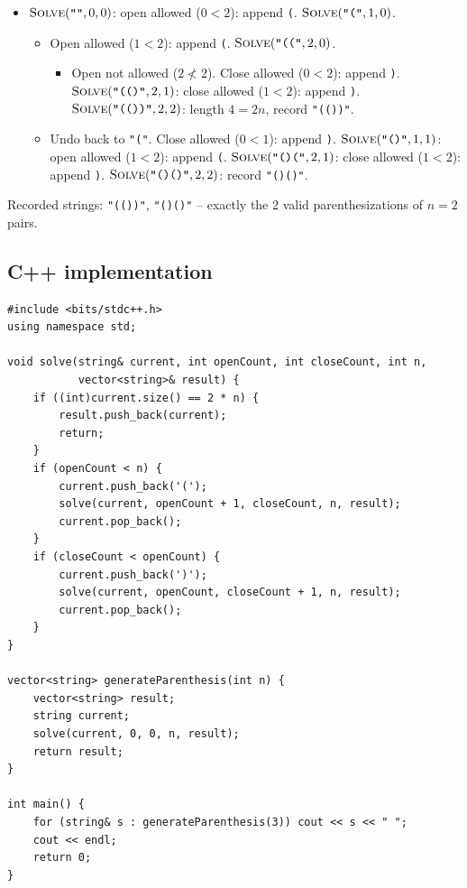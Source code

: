 \begin{itemize}
  \item $\textsc{Solve}(\texttt{""},0,0)$: open allowed ($0<2$):
        append \texttt{(}. $\textsc{Solve}(\texttt{"("},1,0)$.
  \begin{itemize}
    \item Open allowed ($1<2$): append \texttt{(}.
          $\textsc{Solve}(\texttt{"(("},2,0)$.
    \begin{itemize}
      \item Open not allowed ($2\not<2$). Close allowed ($0<2$): append
            \texttt{)}. $\textsc{Solve}(\texttt{"(()"},2,1)$: close
            allowed ($1<2$): append \texttt{)}.
            $\textsc{Solve}(\texttt{"(())"},2,2)$: length $4=2n$,
            record \texttt{"(())"}.
    \end{itemize}
    \item Undo back to \texttt{"("}. Close allowed ($0<1$): append
          \texttt{)}. $\textsc{Solve}(\texttt{"()"},1,1)$: open allowed
          ($1<2$): append \texttt{(}.
          $\textsc{Solve}(\texttt{"()("},2,1)$: close allowed
          ($1<2$): append \texttt{)}.
          $\textsc{Solve}(\texttt{"()()"},2,2)$: record
          \texttt{"()()"}.
  \end{itemize}
\end{itemize}

Recorded strings: \texttt{"(())"}, \texttt{"()()"} -- exactly the $2$
valid parenthesizations of $n=2$ pairs.

\subsection*{C++ implementation}

\begin{lstlisting}
#include <bits/stdc++.h>
using namespace std;

void solve(string& current, int openCount, int closeCount, int n,
           vector<string>& result) {
    if ((int)current.size() == 2 * n) {
        result.push_back(current);
        return;
    }
    if (openCount < n) {
        current.push_back('(');
        solve(current, openCount + 1, closeCount, n, result);
        current.pop_back();
    }
    if (closeCount < openCount) {
        current.push_back(')');
        solve(current, openCount, closeCount + 1, n, result);
        current.pop_back();
    }
}

vector<string> generateParenthesis(int n) {
    vector<string> result;
    string current;
    solve(current, 0, 0, n, result);
    return result;
}

int main() {
    for (string& s : generateParenthesis(3)) cout << s << " ";
    cout << endl;
    return 0;
}
\end{lstlisting}

